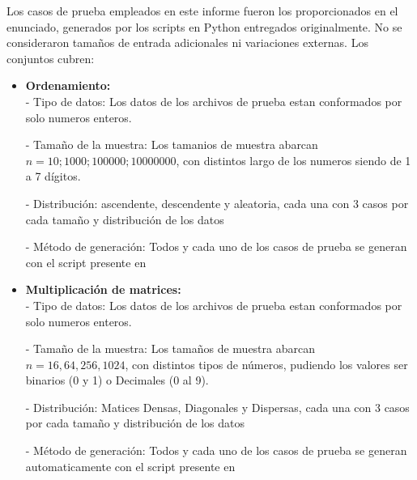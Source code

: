 Los casos de prueba empleados en este informe fueron los proporcionados en el enunciado, generados por los scripts en Python entregados originalmente. No se consideraron tamaños de entrada adicionales ni variaciones externas. Los conjuntos cubren:
\begin{itemize}
  \item \textbf{Ordenamiento:}
  \\
    - Tipo de datos: Los datos de los archivos de prueba estan conformados por solo numeros enteros.
    
    - Tamaño de la muestra: Los tamanios de muestra abarcan  $n = {10; 1000; 100000; 10 000 000}$, con distintos largo de los numeros siendo de 1 a 7 dígitos.
    
    - Distribución: ascendente, descendente y aleatoria, cada una con 3 casos por cada tamaño y distribución de los datos
    
    - Método de generación: Todos y cada uno de los casos de prueba se generan con el script presente en 


    


  \item \textbf{Multiplicación de matrices:}
    \\
    - Tipo de datos: Los datos de los archivos de prueba estan conformados por solo numeros enteros.
    
    - Tamaño de la muestra: Los tamaños de muestra abarcan  $n = {16,64,256,1024}$, con distintos tipos de números, pudiendo los valores ser binarios (0 y 1) o Decimales (0 al 9).
    
    - Distribución: Matices Densas, Diagonales y Dispersas, cada una con 3 casos por cada tamaño y distribución de los datos
    
    - Método de generación: Todos y cada uno de los casos de prueba se generan automaticamente con el script presente en     
  
   
\end{itemize}

